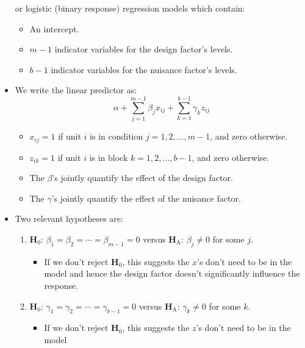 \begin{itemize}
          or logistic (binary response) regression models which contain:
          \begin{itemize}
              \item An intercept.
              \item $ m-1 $ indicator variables for the design factor's levels.
              \item $ b-1 $ indicator variables for the nuisance factor's levels.
          \end{itemize}
    \item We write the linear predictor as:
          \begin{equation}\tag{$\star$}
              \alpha+\sum_{j=1}^{m-1} \beta_j x_{ij}+\sum_{k=1}^{b-1} \gamma_k z_{ij}\label{lpeqn}
          \end{equation}
          \begin{itemize}
              \item $ x_{ij}=1 $ if unit $ i $ is in condition $ j=1,2,\ldots,m-1 $, and zero otherwise.
              \item $ z_{ik}=1 $ if unit $ i $ is in block $ k=1,2,\ldots,b-1 $, and zero otherwise.
              \item The $ \beta $'s jointly quantify the effect of the design factor.
              \item The $ \gamma $'s jointly quantify the effect of the nuisance factor.
          \end{itemize}
    \item Two relevant hypotheses are:
          \begin{enumerate}[(1)]
              \item $ \mathbf{H}_0 $: $ \beta_1=\beta_2=\cdots=\beta_{m-1}=0 $ versus $ \mathbf{H}_\text{A} $: $ \beta_j\ne 0 $ for some $ j $.
                    \begin{itemize}
                        \item If we don't reject $ \mathbf{H}_0 $, this suggests the $ x $'s don't need to be in the model
                              and hence the design factor doesn't significantly influence the response.
                    \end{itemize}
              \item $ \mathbf{H}_0 $: $ \gamma_1=\gamma_2=\cdots=\gamma_{b-1}=0 $ versus $ \mathbf{H}_\text{A} $: $ \gamma_k\ne 0 $ for some $ k $.
                    \begin{itemize}
                        \item If we don't reject $ \mathbf{H}_0 $, this suggests the $ z $'s don't need to be in the model

\end{itemize}
\end{enumerate}
\end{itemize}
